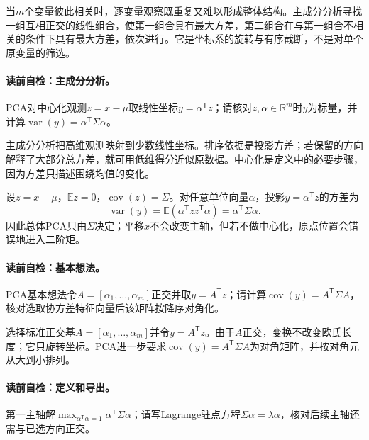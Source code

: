 \label{struct:V4-C04-CH06}
当$m$个变量彼此相关时，逐变量观察既重复又难以形成整体结构。主成分分析寻找一组互相正交的线性组合，使第一组合具有最大方差，第二组合在与第一组合不相关的条件下具有最大方差，依次进行。它是坐标系的旋转与有序截断，不是对单个原变量的筛选。

\paragraph{读前自检：主成分分析。}PCA对中心化观测$z=x-\mu$取线性坐标$y=\alpha^{\mathsf T}z$；请核对$z,\alpha\in\mathbb R^m$时$y$为标量，并计算$\operatorname{var}(y)=\alpha^{\mathsf T}\Sigma\alpha$。\par

主成分分析把高维观测映射到少数线性坐标。排序依据是投影方差；若保留的方向解释了大部分总方差，就可用低维得分近似原数据。中心化是定义中的必要步骤，因为方差只描述围绕均值的变化。

设$z=x-\mu$，$\mathbb Ez=0$，$\operatorname{cov}(z)=\Sigma$。对任意单位向量$\alpha$，投影$y=\alpha^{\mathsf T}z$的方差为
\[
\operatorname{var}(y)=\mathbb E(\alpha^{\mathsf T}zz^{\mathsf T}\alpha)
=\alpha^{\mathsf T}\Sigma\alpha.
\]
因此总体PCA只由$\Sigma$决定；平移$x$不会改变主轴，但若不做中心化，原点位置会错误地进入二阶矩。

\paragraph{读前自检：基本想法。}PCA基本想法令$A=[\alpha_1,\ldots,\alpha_m]$正交并取$y=A^{\mathsf T}z$；请计算$\operatorname{cov}(y)=A^{\mathsf T}\Sigma A$，核对选取协方差特征向量后该矩阵按降序对角化。\par

选择标准正交基$A=[\alpha_1,\ldots,\alpha_m]$并令$y=A^{\mathsf T}z$。由于$A$正交，变换不改变欧氏长度；它只旋转坐标。PCA进一步要求$\operatorname{cov}(y)=A^{\mathsf T}\Sigma A$为对角矩阵，并按对角元从大到小排列。

\paragraph{读前自检：定义和导出。}第一主轴解$\max_{\alpha^{\mathsf T}\alpha=1}\alpha^{\mathsf T}\Sigma\alpha$；请写Lagrange驻点方程$\Sigma\alpha=\lambda\alpha$，核对后续主轴还需与已选方向正交。\par

